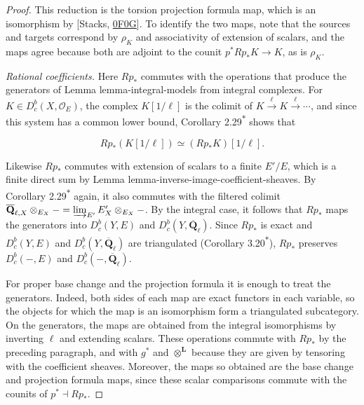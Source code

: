 \documentclass[11pt]{article}
\newcommand{\bpout}[1]{#1\textsuperscript{\hyperlink{bp-outside}{\ensuremath{\ast}}}}
\providecommand{\Dbc}{}\renewcommand{\Dbc}{D^b_c}
\providecommand{\QbarX}{}\renewcommand{\QbarX}{\overline{\mathbf Q}_{\ell,X}}
\begin{document}
\begin{proof}[{Proof}]
This reduction is the torsion projection formula map, which is an isomorphism by [Stacks, \href{https://stacks.math.columbia.edu/tag/0F0G}{0F0G}]. To identify the two maps, note that the sources and targets correspond by \(\rho_K\) and associativity of extension of scalars, and the maps agree because both are adjoint to the counit \(p^*Rp_*K\to K\), as is \(\rho_K\).

\emph{Rational coefficients.} Here \(Rp_*\) commutes with the operations that produce the generators of Lemma lemma-integral-models from integral complexes. For \(K\in\Dbc(X,\mathcal O_E)\), the complex \(K[1/\ell]\) is the colimit of \(K\xrightarrow{\ell}K\xrightarrow{\ell}\cdots\), and since this system has a common lower bound, Corollary \bpout{2.29} shows that

\[
Rp_*(K[1/\ell])\simeq(Rp_*K)[1/\ell].
\]

Likewise \(Rp_*\) commutes with extension of scalars to a finite \(E'/E\), which is a finite direct sum by Lemma lemma-inverse-image-coefficient-sheaves. By Corollary \bpout{2.29} again, it also commutes with the filtered colimit \(\QbarX\otimes_{E_X}-=\varinjlim_{E'}E'_X\otimes_{E_X}-\). By the integral case, it follows that \(Rp_*\) maps the generators into \(\Dbc(Y,E)\) and \(\Dbc(Y,\overline{\mathbf Q}_\ell)\). Since \(Rp_*\) is exact and \(\Dbc(Y,E)\) and \(\Dbc(Y,\overline{\mathbf Q}_\ell)\) are triangulated (Corollary \bpout{3.20}), \(Rp_*\) preserves \(\Dbc(-,E)\) and \(\Dbc(-,\overline{\mathbf Q}_\ell)\).

For proper base change and the projection formula it is enough to treat the generators. Indeed, both sides of each map are exact functors in each variable, so the objects for which the map is an isomorphism form a triangulated subcategory. On the generators, the maps are obtained from the integral isomorphisms by inverting \(\ell\) and extending scalars. These operations commute with \(Rp_*\) by the preceding paragraph, and with \(g^*\) and \(\otimes^{\mathbf L}\) because they are given by tensoring with the coefficient sheaves. Moreover, the maps so obtained are the base change and projection formula maps, since these scalar comparisons commute with the counits of \(p^*\dashv Rp_*\).
\end{proof}



\clearpage{}\hypertarget{bp-outside}{}%
\end{document}
